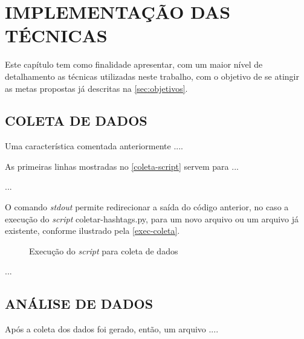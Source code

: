 
\chapter{IMPLEMENTAÇÃO DAS TÉCNICAS}\label{ch:implementacao}

Este capítulo tem como finalidade apresentar, com um maior nível de detalhamento as técnicas utilizadas neste trabalho, com o objetivo de se atingir as metas propostas já descritas na \autoref{sec:objetivos}.

\section{COLETA DE DADOS}
Uma característica comentada anteriormente ....

As primeiras linhas mostradas no \autoref{coleta-script} servem para ...

\codigoPython


...


O comando \textit{stdout} permite redirecionar a saída do código anterior, no caso a execução do \textit{script} coletar-hashtags.py, para um novo arquivo ou um arquivo já existente, conforme ilustrado pela \autoref{exec-coleta}.

\begin{figure}[h]
	\centering
	\caption{Execução do \textit{script} para coleta de dados}
	\label{exec-coleta}
\end{figure}

...


\section{ANÁLISE DE DADOS}
Após a coleta dos dados foi gerado, então, um arquivo ....

